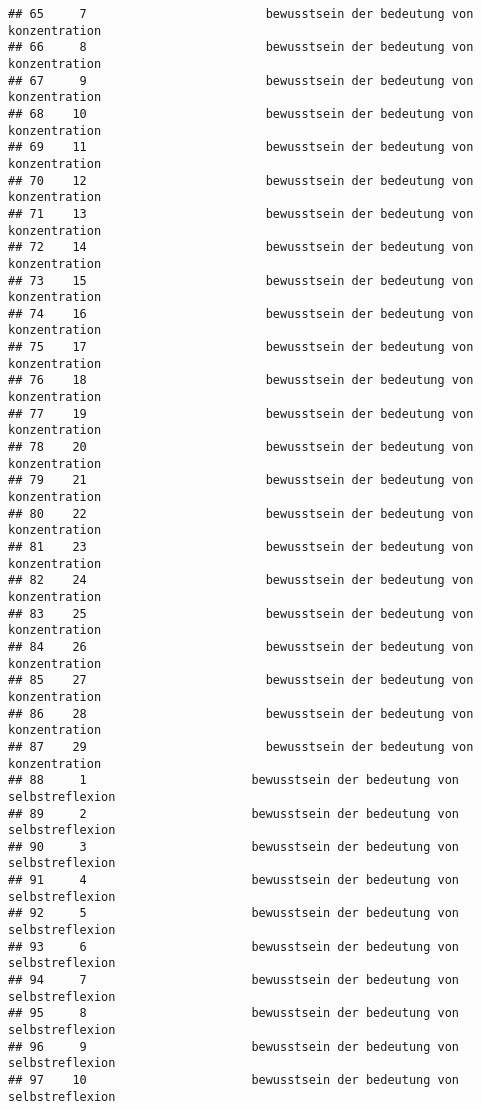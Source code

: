 \documentclass[
]{article}
\begin{document}
\begin{verbatim}
## 65     7                         bewusstsein der bedeutung von konzentration
## 66     8                         bewusstsein der bedeutung von konzentration
## 67     9                         bewusstsein der bedeutung von konzentration
## 68    10                         bewusstsein der bedeutung von konzentration
## 69    11                         bewusstsein der bedeutung von konzentration
## 70    12                         bewusstsein der bedeutung von konzentration
## 71    13                         bewusstsein der bedeutung von konzentration
## 72    14                         bewusstsein der bedeutung von konzentration
## 73    15                         bewusstsein der bedeutung von konzentration
## 74    16                         bewusstsein der bedeutung von konzentration
## 75    17                         bewusstsein der bedeutung von konzentration
## 76    18                         bewusstsein der bedeutung von konzentration
## 77    19                         bewusstsein der bedeutung von konzentration
## 78    20                         bewusstsein der bedeutung von konzentration
## 79    21                         bewusstsein der bedeutung von konzentration
## 80    22                         bewusstsein der bedeutung von konzentration
## 81    23                         bewusstsein der bedeutung von konzentration
## 82    24                         bewusstsein der bedeutung von konzentration
## 83    25                         bewusstsein der bedeutung von konzentration
## 84    26                         bewusstsein der bedeutung von konzentration
## 85    27                         bewusstsein der bedeutung von konzentration
## 86    28                         bewusstsein der bedeutung von konzentration
## 87    29                         bewusstsein der bedeutung von konzentration
## 88     1                       bewusstsein der bedeutung von selbstreflexion
## 89     2                       bewusstsein der bedeutung von selbstreflexion
## 90     3                       bewusstsein der bedeutung von selbstreflexion
## 91     4                       bewusstsein der bedeutung von selbstreflexion
## 92     5                       bewusstsein der bedeutung von selbstreflexion
## 93     6                       bewusstsein der bedeutung von selbstreflexion
## 94     7                       bewusstsein der bedeutung von selbstreflexion
## 95     8                       bewusstsein der bedeutung von selbstreflexion
## 96     9                       bewusstsein der bedeutung von selbstreflexion
## 97    10                       bewusstsein der bedeutung von selbstreflexion

\end{verbatim}
\end{document}
